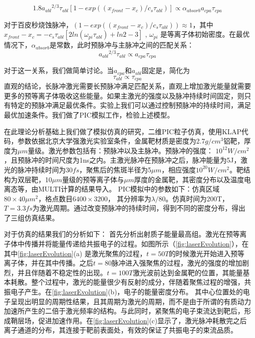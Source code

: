 \begin{equation}
\label{eqn:OptimalCondition}
1.8 {a_{abl}}^{2/3} {\tau}_{abl}[1-exp((x_{front}-x_c)/{c_s{\tau}_{abl}})]  \propto {\alpha}_{absorb} a_{cpa} \tau_{cpa}
\end{equation}

对于百皮秒烧蚀脉冲，$(1-exp((x_{front}-x_c)/{c_s{\tau}_{abl}})) \approx 1 $，其中 $x_{front}-x_c= -{c_s {\tau}_{abl}}[2ln(\omega_{pi} {\tau}_{abl}) + ln2 -3]$ \cite{mora2003plasma},  $\omega_{pi}$ 是等离子体初始密度。在最优情况下，${\alpha}_{absorb}$是常数，此时预脉冲与主脉冲之间的匹配关系：
\begin{equation*}
\label{eqn:MatchEquation}
{a_{abl}}^{2/3} {\tau}_{abl} \propto a_{cpa} \tau_{cpa}
\end{equation*}

对于这一关系，我们做简单讨论。当$a_{cpa}$和$a_{abl}$固定是，简化为
\begin{equation*}
\label{eqn:MatchEquation1}
{\tau}_{abl} \propto \tau_{cpa} 
\end{equation*}
 直观的结论，长脉冲激光需要长预脉冲满足匹配关系，直观上增加激光能量就需要更多的预等离子体吸收这些能量。如果主激光的强度以及脉冲持续时间固定，则只有特定的预脉冲满足最优条件。实验上我们可以通过控制预脉冲的持续时间，满足最优加速条件。我们做了PIC模拟工作，检验上述模型。








在此理论分析基础上我们做了模拟仿真的研究，二维PIC粒子仿真，使用KLAP代码，参数依据北京大学强激光实验室条件，金属靶材质是密度为2.7$g/cm^3$铝靶，厚度为$\mu m$量级。激光参数包括有：预脉冲以及主脉冲。预脉冲的强度： $10^12W/cm^2$，且预脉冲的时间尺度为1ns之内。主激光脉冲在预脉冲之后，脉冲能量为5J，激光的脉冲持续时间为$30fs$，聚焦后的焦斑半径为5$\mu m$，相应强度$10^20W/cm^2$。靶结构为双层靶，10$\mu  m$量级的预等离子体与$\mu m$厚度的金属靶，其密度分布以及温度电离态等，由MULTI计算的结果导入。 PIC模拟中的参数如下：仿真区域$80 \times 40 \mu m^2$，格点数目$6400 \times 3200$， 其分辨率为$\lambda / 80$。仿真时间为200T， $T=3.3fs$为激光周期。通过改变预脉冲的持续时间，得到不同的密度分布，得出了三组仿真结果。



对于仿真的结果我们的分析如下：
首先分析出射质子能量最高组。激光在预等离子体中传播并将能量传递给共振电子的过程。如图所示（\ref{fig:laserEvolution}），在其中\ref{fig:laserEvolution}(a) 是激光聚焦的过程，$t=50T$的时候激光开始进入预等离子体，并在其中传播。之后$t=80$脉冲进入强聚焦的过程，激光的强度的增加剧烈，并且伴随着不稳定性的出现。$t=100T$激光波前达到金属靶的位置，其能量基本耗散。整个过程中，激光的能量很少有反射的成分，伴随着聚焦过程的增强，共振电子产生。在\ref{fig:laserEvolution}(b)，电子的能量密度分布。 其中心位置处的电子呈现出明显的周期性结果，且其周期为激光的周期，而不是由于所谓的有质动力加速所产生的二倍于激光频率的结构。与此同时，紧聚焦的电子束流达到靶后，形成鞘层场，促进加速作用。在\ref{fig:laserEvolution}(c)显示了，激光脉冲耗散完之后离子通道的分布，其连接于靶前表面处，有效的保证了共振电子的束流品质。


